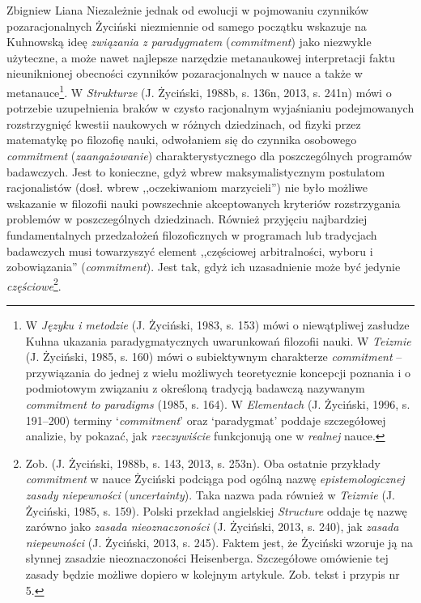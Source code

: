 \begin{artplenv}{Zbigniew Liana}
Niezależnie jednak od ewolucji w pojmowaniu czynników pozaracjonalnych Życiński niezmiennie od samego początku wskazuje
na Kuhnowską ideę \textit{związania z paradygmatem }(\textit{commitment}) jako niezwykle użyteczne, a może nawet najlepsze
narzędzie metanaukowej interpretacji faktu nieuniknionej obecności czynników
pozaracjonalnych w nauce a także w metanauce\footnote{W \textit{Języku i metodzie} \label{ref:RNDYoSNyQG6OT}(J. Życiński, 1983, s. 153)
mówi o niewątpliwej
zasłudze Kuhna ukazania paradygmatycznych uwarunkowań filozofii nauki. W \textit{Teizmie} \label{ref:RNDJ9iyAcBeRp}(J.
Życiński, 1985, s. 160) mówi o subiektywnym charakterze \textit{commitment} -- przywiązania do jednej z wielu możliwych
teoretycznie koncepcji poznania i o podmiotowym związaniu z określoną tradycją badawczą nazywanym \textit{commitment to
paradigms} \label{ref:RND7uoHzvi4cv}(1985, s. 164). W \textit{Elementach} \label{ref:RNDiRufhvdQjS}(J. Życiński, 1996,
s. 191–200) terminy `\textit{commitment}' oraz `paradygmat' poddaje szczegółowej analizie, by pokazać, jak
\textit{rzeczywiście }funkcjonują one w \textit{realnej} nauce.}. W \textit{Strukturze }\label{ref:RNDlo3gRg9nYs}(J.
Życiński, 1988b, s. 136n, 2013, s. 241n) mówi o potrzebie uzupełnienia braków w czysto racjonalnym wyjaśnianiu
podejmowanych rozstrzygnięć kwestii naukowych w różnych dziedzinach, od fizyki przez matematykę po filozofię nauki,
odwołaniem się do czynnika osobowego \textit{commitment} (\textit{zaangażowanie}) charakterystycznego dla poszczególnych
programów badawczych. Jest to konieczne, gdyż wbrew maksymalistycznym postulatom racjonalistów (dosł. wbrew
,,oczekiwaniom marzycieli'') nie było możliwe wskazanie w filozofii nauki powszechnie akceptowanych kryteriów
rozstrzygania problemów w poszczególnych dziedzinach. Również przyjęciu najbardziej fundamentalnych przedzałożeń
filozoficznych w programach lub tradycjach badawczych musi towarzyszyć element ,,częściowej arbitralności,
wyboru i zobowiązania'' (\textit{commitment}).
Jest tak, gdyż ich uzasadnienie może być jedynie \textit{częściowe}\footnote{Zob.
\label{ref:RNDNqJzVjNuqB}(J. Życiński, 1988b, s. 143, 2013, s. 253n). Oba ostatnie przykłady \textit{commitment} w nauce
Życiński podciąga pod ogólną nazwę \textit{epistemologicznej zasady niepewności }(\textit{uncertainty}). Taka nazwa pada
również w \textit{Teizmie} \label{ref:RNDTYIhxUDXK4}(J. Życiński, 1985, s. 159). Polski przekład angielskiej
\textit{Structure} oddaje tę nazwę zarówno jako \textit{zasada nieoznaczoności} \label{ref:RNDcZvyKiHaKS}(J. Życiński,
2013, s. 240), jak \textit{zasada niepewności} \label{ref:RNDwSXdH0AKWY}(J. Życiński, 2013, s. 245). Faktem jest, że
Życiński wzoruje ją na słynnej zasadzie nieoznaczoności Heisenberga. Szczegółowe omówienie tej zasady będzie możliwe
dopiero w kolejnym artykule. Zob. tekst i przypis nr 5.}.


\end{artplenv}
